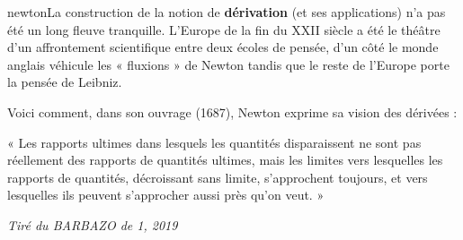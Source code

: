 \documentclass[a4paper,11pt]{article}
\begin{document}
\begin{chistoire}
\vspace{-0.22cm}
\lettrine[findent=.5em,nindent=0pt,lines=3,image,novskip=0pt]{newton}{}La construction de la notion de \textbf{dérivation} (et ses applications) n’a pas été un long fleuve tranquille. L’Europe de la fin du XXII siècle a été le théâtre d’un affrontement scientifique entre deux écoles de pensée, d’un côté le monde anglais véhicule les « fluxions » de Newton tandis que le reste de l’Europe porte la pensée de Leibniz. 

Voici comment, dans son ouvrage (1687), Newton exprime sa vision des dérivées :

« Les rapports ultimes dans lesquels les quantités disparaissent ne sont pas réellement des rapports de quantités ultimes, mais les limites vers lesquelles les rapports de quantités, décroissant sans limite, s’approchent toujours, et vers lesquelles ils peuvent s’approcher aussi près qu’on veut. »

\smallskip

\hfill\textit{\tiny Tiré du BARBAZO de 1, 2019}
\end{chistoire}
\end{document}
